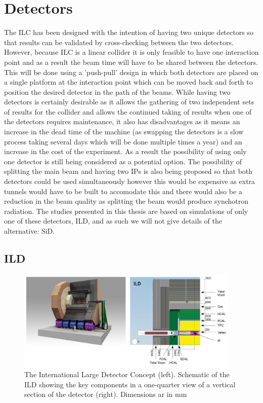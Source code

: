 \section{Detectors}
The \ac{ILC} has been designed with the intention of having two unique detectors so that results can be validated by cross-checking between the two detectors. However, because \ac{ILC} is a linear collider it is only feasible to have one interaction point and as a result the beam time will have to be shared between the detectors. This will be done using a 'push-pull' design in which both detectors are placed on a single platform at the interaction point which can be moved back and forth to position the desired detector in the path of the beams. While having two detectors is certainly desirable as it allows the gathering of two independent sets of results for the collider and allows the continued taking of results when one of the detectors requires maintenance, it also has disadvantages as it means an increase in the dead time of the machine (as swapping the detectors is a slow process taking several days which will be done multiple times a year) and an increase in the cost of the experiment. As a result the possibility of using only one detector is still being considered as a potential option. The possibility of splitting the main beam and having two IPs is also being proposed so that both detectors could be used simultaneously however this would be expensive as extra tunnels would have to be built to accomodate this and there would also be a reduction in the beam quality as splitting the beam would produce synchotron radiation. The studies presented in this thesis are based on simulations of only one of these detectors, \ac{ILD}\cite{ILD}, and as such we will not give details of the alternative: \ac{SiD}\cite{Aihara:2009ad}. 

\subsection{ILD}
\begin{figure}
  \centering
  \includegraphics[width=0.95\textwidth,keepaspectratio]{Experiments/fig/ILD}
  \caption[ILD Detector]{The International Large Detector Concept (left). Schematic of the ILD showing the key components in a one-quarter view of a vertical section of the detector (right). Dimensions ar in mm \cite{Behnke:2013xla}}
  \label{Fig:ILD}
\end{figure}

